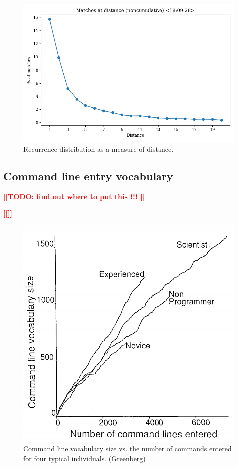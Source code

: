 \documentclass[thesis=M,english]{FITthesis}[2012/10/20]
\newcommand{\todotext}[1]{\textcolor{red}{\textbf{[[#1]]}}}
\newcommand{\tmpframe}[1]{\fbox{#1}}
\renewcommand{\tmpframe}[1]{#1}
\begin{document}
\begin{figure}
\centering
  \tmpframe{\includegraphics[width=\linewidth]{figures/greenberg_new/plot_cmdline-recurr-rate.png}} 
  \caption{Recurrence distribution as a measure of distance.}
\end{figure}


\subsection{Command line entry vocabulary}

\todotext{TODO: find out where to put this !!! }




\todotext{}





\begin{figure}
\centering
  \tmpframe{\includegraphics[width=0.6\linewidth]{figures/greenberg/plot_ref_cmdline-vocab-size.png}}
  \caption{Command line vocabulary size vs. the number of commands
entered for four typical individuals. (Greenberg)}
\end{figure}
\end{document}
